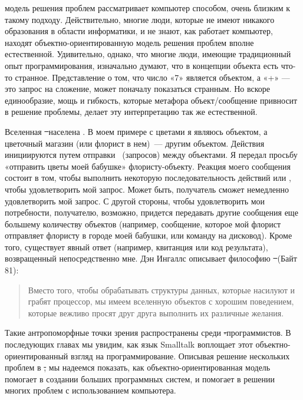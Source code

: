  модель решения проблем рассматривает компьютер
способом, очень близким к такому подходу. Действительно, многие люди, 
которые не имеют никакого образования в области информатики, и не знают, 
как работает компьютер, находят объектно-ориенти\-рован\-ную модель решения 
проблем вполне естественной. Удивительно, однако, что многие люди, 
имеющие традиционный опыт программирования, изначально думают, что в 
концепции объекта есть что-то странное. Представление о том, что число «7» 
является объектом, а «+» --- это запрос на сложение, может поначалу 
показаться странным. Но вскоре единообразие, мощь и гибкость, которые 
метафора объект/сообщение привносит в решение проблемы, делает эту 
интерпретацию так же естественной.

Вселенная \st\ населена . В моем примере с цветами я являюсь объектом, 
а цветочный магазин (или флорист в нем)\ --- другим объектом. Действия 
инициируются путем отправки \ (запросов) между объектами. Я передал 
просьбу «отправить цветы моей бабушке» флористу-объекту. Реакция 
моего сообщения состоит в том, чтобы выполнить некоторую последовательность 
действий или , чтобы удовлетворить мой запрос. Может быть, получатель 
сможет немедленно удовлетворить мой запрос. С другой стороны, чтобы удовлетворить 
мои потребности, получателю, возможно, придется передавать другие сообщения 
еще большему количеству объектов (например, сообщение, которое мой флорист 
отправляет флористу в городе моей бабушки, или команду на дисковод). Кроме 
того, существует явный ответ (например, квитанция или код результата), 
возвращенный непосредственно мне. Дэн Ингаллс описывает философию \st\ (Байт 81):

\begin{quote}
Вместо того, чтобы обрабатывать структуры данных, которые насилуют и грабят 
процессор, мы имеем вселенную объектов с хорошим поведением, которые вежливо 
просят друг друга выполнить их различные желания.
\end{quote}

Такие антропоморфные точки зрения распространены среди \st-программистов. 
В последующих главах мы увидим, как язык Smalltalk воплощает этот 
объектно-ориентированный взгляд на программирование. Описывая решение 
нескольких проблем в \st, мы надеемся показать, как объектно-ориентированная 
модель помогает в создании больших программных систем, и помогает в решении 
многих проблем с использованием компьютера.


\secup
